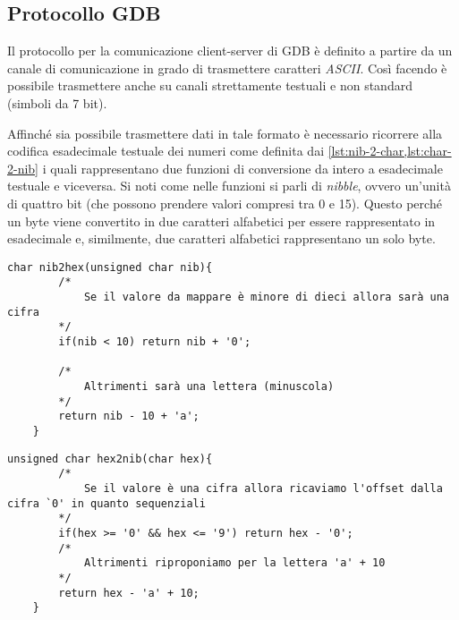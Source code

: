\subsection{Protocollo GDB}

Il protocollo per la comunicazione client-server di GDB è definito a partire da un canale di comunicazione in grado di trasmettere caratteri \textit{ASCII}.
Così facendo è possibile trasmettere anche su canali strettamente testuali e non standard (simboli da 7 bit).

Affinché sia possibile trasmettere dati in tale formato è necessario ricorrere alla codifica esadecimale testuale dei numeri come definita dai \cref{lst:nib-2-char,lst:char-2-nib} i quali rappresentano due funzioni di conversione da intero a esadecimale testuale e viceversa.
Si noti come nelle funzioni si parli di \textit{nibble}, ovvero un'unità di quattro bit (che possono prendere valori compresi tra 0 e 15). Questo perché un byte viene convertito in due caratteri alfabetici per essere rappresentato in esadecimale e, similmente, due caratteri alfabetici rappresentano un solo byte.

\noindent\begin{minipage}{\textwidth}
    \begin{lstlisting}[style=C, caption={Funzione di conversione da nibble a carattere alfabetico}, label=lst:nib-2-char]
    char nib2hex(unsigned char nib){
        /*
            Se il valore da mappare è minore di dieci allora sarà una cifra
        */
        if(nib < 10) return nib + '0'; 

        /*
            Altrimenti sarà una lettera (minuscola)
        */
        return nib - 10 + 'a';
    }
    \end{lstlisting}
\end{minipage}

\noindent\begin{minipage}{\textwidth}
    \begin{lstlisting}[style=C, caption={Funzione di conversione da carattere alfabetico a nibble}, label=lst:char-2-nib]
    unsigned char hex2nib(char hex){
        /*
            Se il valore è una cifra allora ricaviamo l'offset dalla cifra `0' in quanto sequenziali
        */
        if(hex >= '0' && hex <= '9') return hex - '0';
        /*
            Altrimenti riproponiamo per la lettera 'a' + 10
        */
        return hex - 'a' + 10;
    }
    \end{lstlisting}
\end{minipage}

